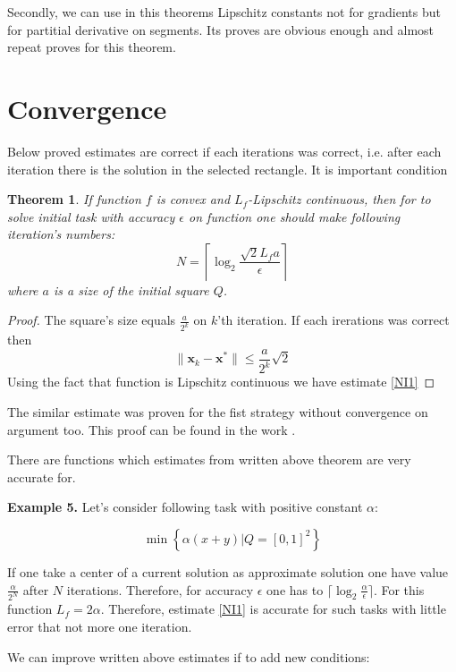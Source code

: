 \documentclass[12pt]{article}
\newtheorem{theorem}{Theorem}[section]
\begin{document}
Secondly, we can use in this theorems Lipschitz constants not for gradients but for partitial derivative on segments. Its proves are obvious enough and almost repeat proves for this theorem.


\section{Convergence}

Below proved estimates are correct if each iterations was correct, i.e. after each iteration there is the solution in the selected rectangle. It is important condition

\begin{theorem}
If function $f$ is convex and $L_f$-Lipschitz continuous, then for to solve initial task with accuracy $\epsilon$ on function one should make following iteration's numbers:
\begin{equation}\label{NI1}N = \left\lceil\log_2\frac{\sqrt{2}L_fa}{\epsilon}\right\rceil\end{equation}
where $a$ is a size of the initial square $Q$.
\end{theorem}

\begin{proof}
The square's size equals $\frac{a}{2^k}$ on $k$'th iteration. If each irerations was correct then
$$\|\textbf{x}_k-\textbf{x}^*\|\leq \frac{a}{2^k}\sqrt{2}$$
Using the fact that function is Lipschitz continuous we have estimate \ref{NI1}
\end{proof}

The similar estimate was proven for the fist strategy without convergence on argument too. This proof can be found in the work \cite{Ston_Pas}.

There are functions which estimates from written above theorem are very accurate for.

\textbf{Example 5.} Let's consider following task with positive constant $\alpha$:

$$\min\left\{\alpha(x+y)|Q = [0,1]^2\right\}$$

If one take a center of a current solution as approximate  solution one have value $\frac{\alpha}{2^N}$ after $N$ iterations. Therefore, for accuracy $\epsilon$ one has to $\lceil\log_2\frac{\alpha}{\epsilon}\rceil$. For this function $L_f = 2\alpha$. Therefore, estimate \eqref{NI1} is accurate for such tasks with little error that not more one iteration.


We can improve written above estimates if to add new conditions:
\end{document}
